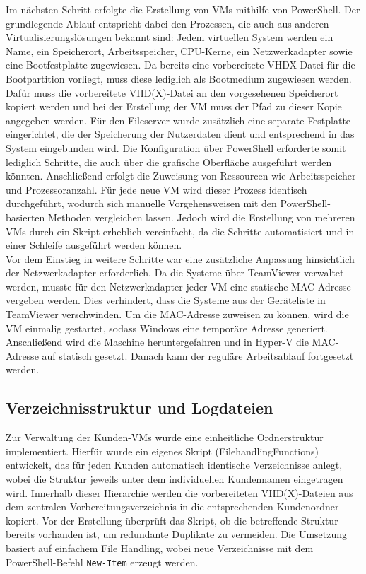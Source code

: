 \documentclass[a4paper,12pt]{article}
\begin{document}
Im nächsten Schritt erfolgte die Erstellung von VMs mithilfe von PowerShell.
Der grundlegende Ablauf entspricht dabei den Prozessen, die auch aus anderen Virtualisierungslösungen bekannt sind:
Jedem virtuellen System werden ein Name, ein Speicherort, Arbeitsspeicher, CPU-Kerne, ein Netzwerkadapter sowie eine Bootfestplatte zugewiesen.
Da bereits eine vorbereitete VHDX-Datei für die Bootpartition vorliegt, muss diese lediglich als Bootmedium zugewiesen werden.
Dafür muss die vorbereitete VHD(X)-Datei an den vorgesehenen Speicherort kopiert werden und bei der Erstellung der VM muss der Pfad zu dieser Kopie angegeben werden.
Für den Fileserver wurde zusätzlich eine separate Festplatte eingerichtet, die der Speicherung der Nutzerdaten dient und entsprechend in das System eingebunden wird.
Die Konfiguration über PowerShell erforderte somit lediglich Schritte, die auch über die grafische Oberfläche ausgeführt werden könnten.
Anschließend erfolgt die Zuweisung von Ressourcen wie Arbeitsspeicher und Prozessoranzahl.
Für jede neue VM wird dieser Prozess identisch durchgeführt, wodurch sich manuelle Vorgehensweisen mit den PowerShell-basierten Methoden vergleichen lassen.
Jedoch wird die Erstellung von mehreren VMs durch ein Skript erheblich vereinfacht, da die Schritte automatisiert und in einer Schleife ausgeführt werden können.\\

Vor dem Einstieg in weitere Schritte war eine zusätzliche Anpassung hinsichtlich der Netzwerkadapter erforderlich.
Da die Systeme über TeamViewer verwaltet werden, musste für den Netzwerkadapter jeder VM eine statische MAC-Adresse vergeben werden.
Dies verhindert, dass die Systeme aus der Geräteliste in TeamViewer verschwinden.
Um die MAC-Adresse zuweisen zu können, wird die VM einmalig gestartet, sodass Windows eine temporäre Adresse generiert.
Anschließend wird die Maschine heruntergefahren und in Hyper-V die MAC-Adresse auf statisch gesetzt.
Danach kann der reguläre Arbeitsablauf fortgesetzt werden.

\subsection{Verzeichnisstruktur und Logdateien}

Zur Verwaltung der Kunden-VMs wurde eine einheitliche Ordnerstruktur implementiert. 
Hierfür wurde ein eigenes Skript (FilehandlingFunctions) entwickelt, das für jeden Kunden automatisch identische Verzeichnisse anlegt, wobei die Struktur jeweils unter dem individuellen Kundennamen eingetragen wird. 
Innerhalb dieser Hierarchie werden die vorbereiteten VHD(X)-Dateien aus dem zentralen Vorbereitungsverzeichnis in die entsprechenden Kundenordner kopiert. 
Vor der Erstellung überprüft das Skript, ob die betreffende Struktur bereits vorhanden ist, um redundante Duplikate zu vermeiden. 
Die Umsetzung basiert auf einfachem File Handling, wobei neue Verzeichnisse mit dem PowerShell-Befehl \lstinline|New-Item| erzeugt werden.\\
\end{document}
